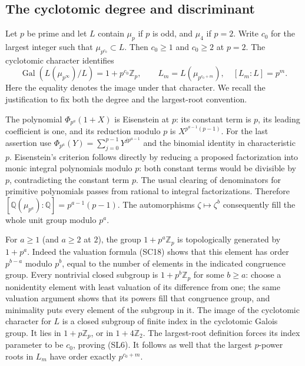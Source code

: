 \subsection{The cyclotomic degree and discriminant}

Let $p$ be prime and let $L$ contain $\mu_p$ if $p$ is odd,
and $\mu_4$ if $p=2$.  Write $c_0$ for the largest integer
such that $\mu_{p^{c_0}}\subset L$.  Then $c_0\ge1$ and
$c_0\ge2$ at $p=2$.  The cyclotomic character identifies
\[
 \operatorname{Gal}(L(\mu_{p^\infty})/L)
                         =1+p^{c_0}\mathbb Z_p,
 \qquad
 L_m=L(\mu_{p^{c_0+m}}),\quad [L_m:L]=p^m .
 \tag{SL6}
\]
Here the equality denotes the image under that character.
We recall the justification to fix both the degree and the
largest-root convention.

The polynomial $\Phi_{p^a}(1+X)$ is Eisenstein at $p$:
its constant term is $p$, its leading coefficient is one, and
its reduction modulo $p$ is $X^{p^{a-1}(p-1)}$.
For the last assertion use
$\Phi_{p^a}(Y)=\sum_{j=0}^{p-1}Y^{jp^{a-1}}$ and
the binomial identity in characteristic $p$.
Eisenstein's criterion follows directly by reducing a proposed
factorization into monic integral polynomials modulo $p$:
both constant terms would be divisible by $p$, contradicting
the constant term $p$.  The usual clearing of denominators
for primitive polynomials passes from rational to integral
factorizations.  Therefore
$[\mathbb Q(\mu_{p^a}):\mathbb Q]=p^{a-1}(p-1)$.
The automorphisms $\zeta\mapsto\zeta^b$ consequently fill the
whole unit group modulo $p^a$.

For $a\ge1$ (and $a\ge2$ at $2$), the group
$1+p^a\mathbb Z_p$ is topologically generated by $1+p^a$.
Indeed the valuation formula (SC18) shows that this element
has order $p^{b-a}$ modulo $p^b$, equal to the number of
elements in the indicated congruence group.  Every nontrivial
closed subgroup is $1+p^b\mathbb Z_p$ for some $b\ge a$:
choose a nonidentity element with least valuation of its
difference from one; the same valuation argument shows that
its powers fill that congruence group, and minimality puts
every element of the subgroup in it.
The image of the cyclotomic character for $L$ is a closed
subgroup of finite index in the cyclotomic Galois group.
It lies in $1+p\mathbb Z_p$, or in $1+4\mathbb Z_2$.
The largest-root definition forces its index parameter to
be $c_0$, proving (SL6).  It follows as well that the largest
$p$-power roots in $L_m$ have order exactly $p^{c_0+m}$.

